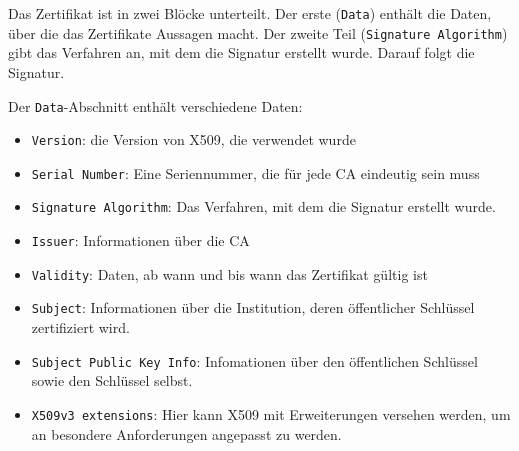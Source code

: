 Das Zertifikat ist in zwei Blöcke  unterteilt. Der erste (\texttt{Data})
enthält die Daten, über die das Zertifikate Aussagen macht. Der zweite
Teil (\texttt{Signature Algorithm}) gibt das Verfahren an, mit dem die
Signatur erstellt wurde. Darauf folgt die Signatur.

Der \texttt{Data}-Abschnitt enthält verschiedene Daten:
\begin{itemize}
\item \texttt{Version}: die Version von X509, die verwendet wurde
\item \texttt{Serial Number}: Eine Seriennummer, die für jede CA
  eindeutig sein muss
\item \texttt{Signature Algorithm}: Das Verfahren, mit dem die Signatur
  erstellt wurde.
\item \texttt{Issuer}: Informationen über die CA
\item \texttt{Validity}: Daten, ab wann und bis wann das Zertifikat
  gültig ist
\item \texttt{Subject}: Informationen über die Institution, deren
  öffentlicher Schlüssel zertifiziert wird.
\item \texttt{Subject Public Key Info}: Infomationen über den
  öffentlichen Schlüssel sowie den Schlüssel selbst.
\item \texttt{X509v3 extensions}: Hier kann X509 mit Erweiterungen
  versehen werden, um an besondere Anforderungen angepasst zu werden.
\end{itemize} 